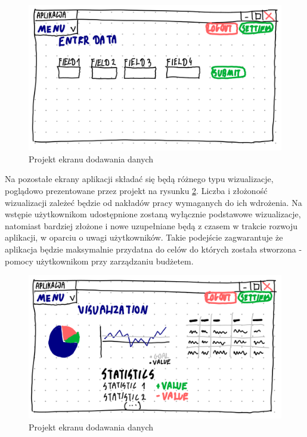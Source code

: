 \documentclass[a4paper,10pt, twoside]{report}
\begin{document}
\begin{large}
\begin{figure}[H]           %
    \centering
    \includegraphics[width=12cm]{figures/Righten_UI_sketch_adddata.png}
    \caption{Projekt ekranu dodawania danych}
    \label{fig:uiprojectadddata}
\end{figure}

{Na pozostałe ekrany aplikacji składać się będą różnego typu wizualizacje, 
poglądowo prezentowane przez projekt na rysunku 
\ref*{fig:uiprojectvisualizations}. Liczba i złożoność wizualizacji zależeć 
będzie od nakładów pracy wymaganych do ich wdrożenia. Na wstępie użytkownikom 
udostępnione zostaną wyłącznie podstawowe wizualizacje, natomiast bardziej 
złożone i nowe uzupełniane będą z czasem w trakcie rozwoju aplikacji, w oparciu 
o uwagi użytkowników. Takie podejście zagwarantuje że aplikacja będzie 
maksymalnie przydatna do celów do których została stworzona - pomocy 
użytkownikom przy zarządzaniu budżetem.}

\begin{figure}[H]           %
    \centering
    \includegraphics[width=12cm]{figures/Righten_UI_sketch_viusalizations.png}
    \caption{Projekt ekranu dodawania danych}
    \label{fig:uiprojectvisualizations}
\end{figure}


\end{large}
\end{document}
